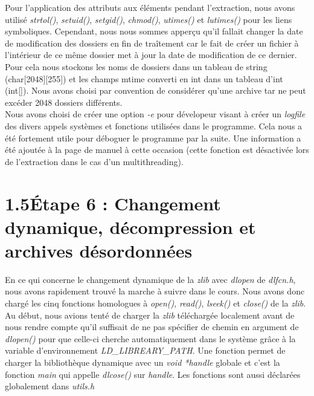 \documentclass[12pt, a4paper]{report}
\begin{document}
\hspace{0.5cm}Pour l'application des attributs aux éléments pendant l'extraction, nous avons utilisé \textit{strtol()}, \textit{setuid()}, \textit{setgid()}, \textit{chmod()}, \textit{utimes()} et \textit{lutimes()} pour les liens symboliques. Cependant, nous nous sommes apperçu qu'il fallait changer la date de modification des dossiers en fin de traîtement car le fait de créer un fichier à l'intérieur de ce même dossier met à jour la date de modification de ce dernier. Pour cela nous stockons les noms de dossiers dans un tableau de string (char[2048][255]) et les champs mtime converti en int dans un tableau d'int (int[]). Nous avons choisi par convention de considérer qu'une archive tar ne peut excéder 2048 dossiers différents. \\

\hspace{0.5cm}Nous avons choisi de créer une option \textit{-e} pour dévelopeur visant à créer un \textit{logfile} des divers appels systèmes et fonctions utilisées dans le programme. Cela nous a été fortement utile pour déboguer le programme par la suite. Une information a été ajoutée à la page de manuel à cette occasion (cette fonction est désactivée lors de l'extraction dans le cas d'un multithreading).

\section*{\hspace{0.6cm}1.5\hspace{0.6cm}Étape 6 : Changement dynamique, décompression et archives désordonnées}
\hspace{1cm}En ce qui concerne le changement dynamique de la \textit{zlib} avec \textit{dlopen} de \textit{dlfcn.h}, nous avons rapidement trouvé la marche à suivre dans le cours. Nous avons donc chargé les cinq fonctions homologues à \textit{open()}, \textit{read()}, \textit{lseek()} et \textit{close()} de la \textit{zlib}. Au début, nous avions tenté de charger la \textit{zlib} téléchargée localement avant de nous rendre compte qu'il suffisait de ne pas spécifier de chemin en argument de \textit{dlopen()} pour que celle-ci cherche automatiquement dans le système grâce à la variable d'environnement \textit{LD\_LIBREARY\_PATH}. Une fonction permet de charger la bibliothèque dynamique avec un \textit{void *handle} globale et c'est la fonction \textit{main} qui appelle \textit{dlcose()} sur \textit{handle}. Les fonctions sont aussi déclarées globalement dans \textit{utils.h}\\
\end{document}
